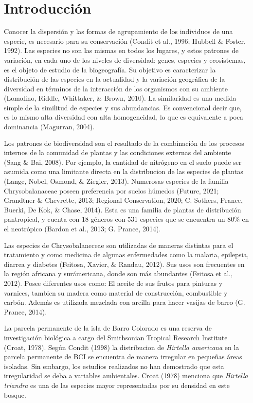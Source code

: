 \documentclass[11pt,]{article}
\begin{document}
\vskip 6.5pt


\noindent  \section{Introducción}\label{introducciuxf3n}

Conocer la dispersión y las formas de agrupamiento de los individuos de
una especie, es necesario para su conservación (Condit et al., 1996;
Hubbell \& Foster, 1992). Las especies no son las mismas en todos los
lugares, y estos patrones de variación, en cada uno de los niveles de
diversidad: genes, especies y ecosistemas, es el objeto de estudio de la
biogeografía. Su objetivo es caracterizar la distribución de las
especies en la actualidad y la variación geográfica de la diversidad en
términos de la interacción de los organismos con su ambiente (Lomolino,
Riddle, Whittaker, \& Brown, 2010). La similaridad es una medida simple
de la similitud de especies y sus abundancias. Es convencional decir
que, es lo mismo alta diversidad con alta homogeneidad, lo que es
equivalente a poca dominancia (Magurran, 2004).

Los patrones de biodiversidad son el resultado de la combinación de los
procesos internos de la comunidad de plantas y las condiciones externas
del ambiente (Sang \& Bai, 2008). Por ejemplo, la cantidad de nitrógeno
en el suelo puede ser asumida como una limitante directa en la
distribucion de las especies de plantas (Lange, Nobel, Osmond, \&
Ziegler, 2013). Numerosas especies de la familia Chrysobalanaceae poseen
preferencia por suelos húmedos (Future, 2021; Grandtner \& Chevrette,
2013; Regional Conservation, 2020; C. Sothers, Prance, Buerki, De Kok,
\& Chase, 2014). Esta es una familia de plantas de distribución
pantropical, y cuenta con 18 géneros con 531 especies que se encuentra
un 80\% en el neotrópico (Bardon et al., 2013; G. Prance, 2014).

Las especies de Chrysobalaneceae son utilizadas de maneras distintas
para el tratamiento y como medicina de algunas enfermedades como la
malaria, epilepsia, diarrea y diabetes (Feitosa, Xavier, \& Randau,
2012). Sus usos son frecuentes en la región africana y surámericana,
donde son más abundantes (Feitosa et al., 2012). Posee diferentes usos
como: El aceite de sus frutos para pinturas y varnices, tambien su
madera como material de construcción, combustible y carbón. Además es
utilizada mezclada con arcilla para hacer vasijas de barro (G. Prance,
2014).

La parcela permanente de la isla de Barro Colorado es una reserva de
investigación biológica a cargo del Smithsonian Tropical Research
Institute (Croat, 1978). Según Condit (1998) la distribucion de
\emph{Hirtella americana} en la parcela permanente de BCI se encuentra
de manera irregular en pequeñas áreas isoladas. Sin embargo, los
estudios realizados no han demostrado que esta irregularidad se deba a
variables ambientales. Croat (1978) menciona que \emph{Hirtella
triandra} es una de las especies mayor representadas por su densidad en
este bosque.
\end{document}
